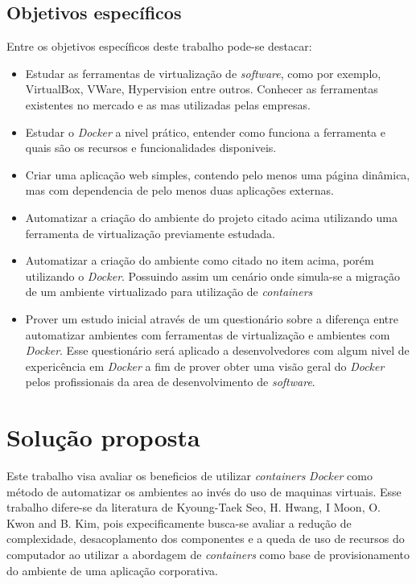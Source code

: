 \documentclass[11pt,a4paper]{article}
\begin{document}
\subsection{Objetivos específicos}\label{sec:objetivos_especificos}

Entre os objetivos específicos deste trabalho pode-se destacar:

\begin{itemize}
  \item Estudar as ferramentas de virtualização de \textit{software}, como por exemplo,
    VirtualBox, VWare, Hypervision entre outros. Conhecer as ferramentas existentes no mercado e as
    mas utilizadas pelas empresas.
  \item Estudar o \textit{Docker} a nivel prático, entender como funciona a ferramenta e quais são os
    recursos e funcionalidades disponiveis.
  \item Criar uma aplicação web simples, contendo pelo menos uma página dinâmica, mas com dependencia
    de pelo menos duas aplicações externas.
  \item Automatizar a criação do ambiente do projeto citado acima utilizando uma ferramenta de virtualização
    previamente estudada.
  \item Automatizar a criação do ambiente como citado no item acima, porém utilizando o \textit{Docker}. Possuindo
    assim um cenário onde simula-se a migração de um ambiente virtualizado para utilização de \textit{containers}
  \item Prover um estudo inicial através de um questionário sobre a diferença entre automatizar
    ambientes com ferramentas de virtualização e ambientes com \textit{Docker}. Esse questionário será aplicado
    a desenvolvedores com algum nivel de expericência em \textit{Docker} a fim de prover obter uma visão geral
    do \textit{Docker} pelos profissionais da area de desenvolvimento de \textit{software}.
\end{itemize}

\section{Solução proposta}

Este trabalho visa avaliar os beneficios de utilizar \textit{containers} \textit{Docker} como método de automatizar
os ambientes ao invés do uso de maquinas virtuais. Esse trabalho difere-se da literatura de Kyoung-Taek Seo,
H. Hwang, I Moon, O. Kwon and B. Kim\cite{Performance_container_vm}, pois expecificamente
busca-se avaliar a redução de complexidade, desacoplamento dos componentes e a queda de uso de recursos do computador
ao utilizar a abordagem de \textit{containers} como base de provisionamento do ambiente de uma aplicação corporativa.
\end{document}
